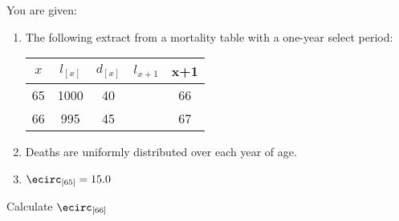 You are given:
\begin{enumerate}
\item The following extract from a mortality table with a one-year select period:
  \begin{center}\begin{tabular}{ccccc}
      $x$ & $l_{[x]}$ & $d_{[x]}$ & $l_{x+1}$ & x+1 \\ \hline
      65  & 1000       & 40          &  \vspace{0.25in}\hspace{0.5in} & 66 \\
      66 & 995         & 45          &  \vspace{0.25in}\hspace{0.5in} & 67
  \end{tabular}\end{center}
  \medskip
\item Deaths are uniformly distributed over each year of age.
\item $\ecirc_{[65]} = 15.0$
\end{enumerate}
\medskip
Calculate $\ecirc_{[66]}$
%




